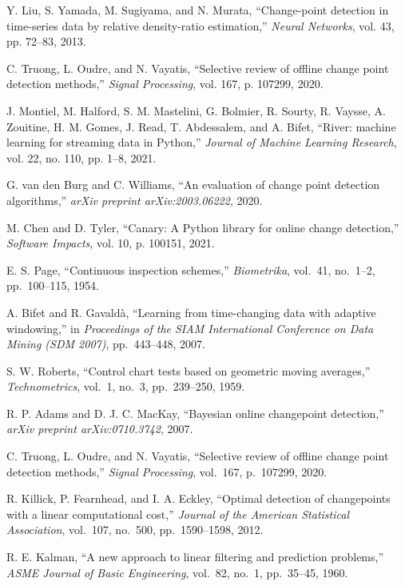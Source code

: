 \documentclass[journal,article,submit,pdftex,moreauthors]{Definitions/mdpi}
\begin{document}
Y. Liu, S. Yamada, M. Sugiyama, and N. Murata, ``Change-point detection in time-series data by relative density-ratio estimation,'' \emph{Neural Networks}, vol. 43, pp. 72--83, 2013.

C. Truong, L. Oudre, and N. Vayatis, ``Selective review of offline change point detection methods,'' \emph{Signal Processing}, vol. 167, p. 107299, 2020.

J. Montiel, M. Halford, S. M. Mastelini, G. Bolmier, R. Sourty, R. Vaysse, A. Zouitine, H. M. Gomes, J. Read, T. Abdessalem, and A. Bifet, ``River: machine learning for streaming data in Python,'' \emph{Journal of Machine Learning Research}, vol. 22, no. 110, pp. 1--8, 2021.

G. van den Burg and C. Williams, ``An evaluation of change point detection algorithms,'' \emph{arXiv preprint arXiv:2003.06222}, 2020.

M. Chen and D. Tyler, ``Canary: A Python library for online change detection,'' \emph{Software Impacts}, vol. 10, p. 100151, 2021.


E. S. Page, ``Continuous inspection schemes,'' \textit{Biometrika}, vol.~41, no.~1--2, pp.~100--115, 1954.

A. Bifet and R. Gavaldà, ``Learning from time-changing data with adaptive windowing,'' in \textit{Proceedings of the SIAM International Conference on Data Mining (SDM 2007)}, pp.~443--448, 2007.

S. W. Roberts, ``Control chart tests based on geometric moving averages,'' \textit{Technometrics}, vol.~1, no.~3, pp.~239--250, 1959.

R. P. Adams and D. J. C. MacKay, ``Bayesian online changepoint detection,'' \textit{arXiv preprint arXiv:0710.3742}, 2007.

C. Truong, L. Oudre, and N. Vayatis, ``Selective review of offline change point detection methods,'' \textit{Signal Processing}, vol.~167, p.~107299, 2020.

R. Killick, P. Fearnhead, and I. A. Eckley, ``Optimal detection of changepoints with a linear computational cost,'' \textit{Journal of the American Statistical Association}, vol.~107, no.~500, pp.~1590--1598, 2012.

R. E. Kalman, ``A new approach to linear filtering and prediction problems,'' \textit{ASME Journal of Basic Engineering}, vol.~82, no.~1, pp.~35--45, 1960.
\end{document}
